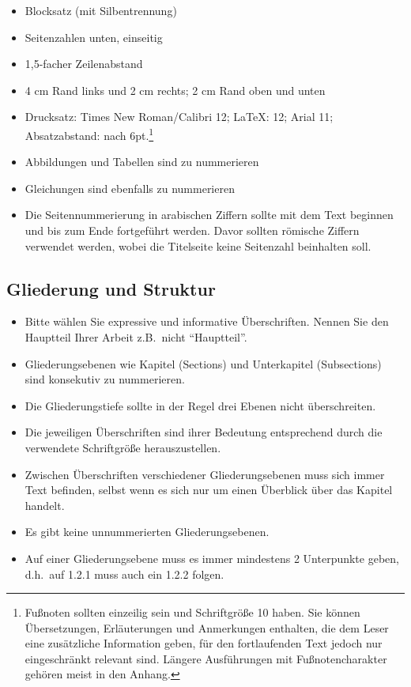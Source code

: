 \documentclass[a4paper,12pt]{scrartcl} %
\begin{document}
\begin{itemize}
\item Blocksatz (mit Silbentrennung)
\item Seitenzahlen unten, einseitig
\item 1,5-facher Zeilenabstand
\item 4 cm Rand links und 2 cm rechts; 2 cm Rand oben und unten
\item Drucksatz: Times New Roman/Calibri 12; \LaTeX: 12; Arial 11; Absatzabstand:
nach 6pt.\footnote{Fußnoten sollten einzeilig sein und Schriftgröße 10 haben. Sie können Übersetzungen, Erläuterungen und Anmerkungen enthalten, die dem Leser eine zusätzliche Information geben, für den fortlaufenden Text jedoch nur eingeschränkt relevant sind. Längere Ausführungen mit Fußnotencharakter gehören meist in den Anhang.}
\item Abbildungen und Tabellen sind zu nummerieren
\item Gleichungen sind ebenfalls zu nummerieren
\item Die Seitennummerierung in arabischen Ziffern sollte mit dem Text beginnen und bis zum Ende fortgeführt werden. Davor sollten römische Ziffern verwendet werden, wobei die Titelseite keine Seitenzahl beinhalten soll.
\end{itemize}

\subsection{Gliederung und Struktur}

\begin{itemize}
   \item Bitte wählen Sie expressive und informative Überschriften. Nennen Sie den Hauptteil Ihrer Arbeit z.B.\ nicht ``Hauptteil''.
   \item Gliederungsebenen wie Kapitel (Sections) und Unterkapitel (Subsections) sind konsekutiv zu nummerieren.
   \item Die Gliederungstiefe sollte in der Regel drei Ebenen nicht überschreiten.
   \item Die jeweiligen Überschriften sind ihrer Bedeutung entsprechend durch die verwendete Schriftgröße herauszustellen.
   \item Zwischen Überschriften verschiedener Gliederungsebenen muss sich immer Text befinden, selbst wenn es sich nur um einen Überblick über das Kapitel handelt.
   \item Es gibt keine unnummerierten Gliederungsebenen.
   \item Auf einer Gliederungsebene muss es immer mindestens 2 Unterpunkte geben, d.h.\ auf 1.2.1 muss auch ein 1.2.2 folgen.
 \end{itemize}
\end{document}
